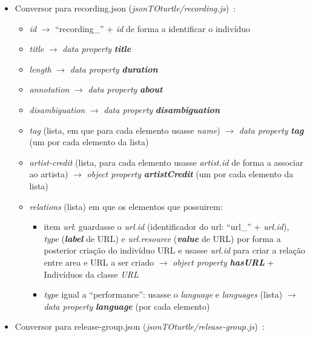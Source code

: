 \documentclass{article}
\begin{document}
\begin{itemize}
\begin{itemize}
\begin{itemize}
                \end{itemize}
        \end{itemize}
    \item Conversor para recording.json (\textit{jsonTOturtle/recording.js})~\cite{mbRec}:
        \begin{itemize}
            \item \textit{id} $\to$ ``recording\_'' + \textit{id} de forma a identificar o indivíduo
            \item \textit{title} $\to$ \textit{data property} \textit{\textbf{title}}
            \item \textit{length} $\to$ \textit{data property} \textit{\textbf{duration}}
            \item \textit{annotation} $\to$ \textit{data property} \textit{\textbf{about}}
            \item \textit{disambiguation} $\to$ \textit{data property} \textit{\textbf{disambiguation}}
            \item \textit{tag} (lista, em que para cada elemento usasse \textit{name}) $\to$ \textit{data property} \textit{\textbf{tag}} (um por cada elemento da lista)
            \item \textit{artist-credit} (lista, para cada elemento usasse \textit{artist.id} de forma a associar ao artista) $\to$ \textit{object property} \textit{\textbf{artistCredit}} (um por cada elemento da lista)
            \item \textit{relations} (lista) em que os elementos que possuirem:
                \begin{itemize}
                    \item item \textit{url}: guardasse o \textit{url.id} (identificador do url: ``url\_'' + \textit{url.id}), \textit{type} (\textit{\textbf{label}} de URL) e \textit{url.resource} (\textit{\textbf{value}} de URL) por forma a posterior criação do indivíduo URL e usasse \textit{url.id} para criar a relação entre area e URL a ser criado $\to$ \textit{object property} \textit{\textbf{hasURL}} + Indivíduos da classe \textit{URL}
                    \item \textit{type} igual a ``performance'': usasse o \textit{language} e \textit{languages} (lista) $\to$ \textit{data property} \textit{\textbf{language}} (por cada elemento)
                \end{itemize}
        \end{itemize}
    \item Conversor para release-group.json (\textit{jsonTOturtle/release-group.js})~\cite{mbReGp}:

\end{itemize}
\end{document}
